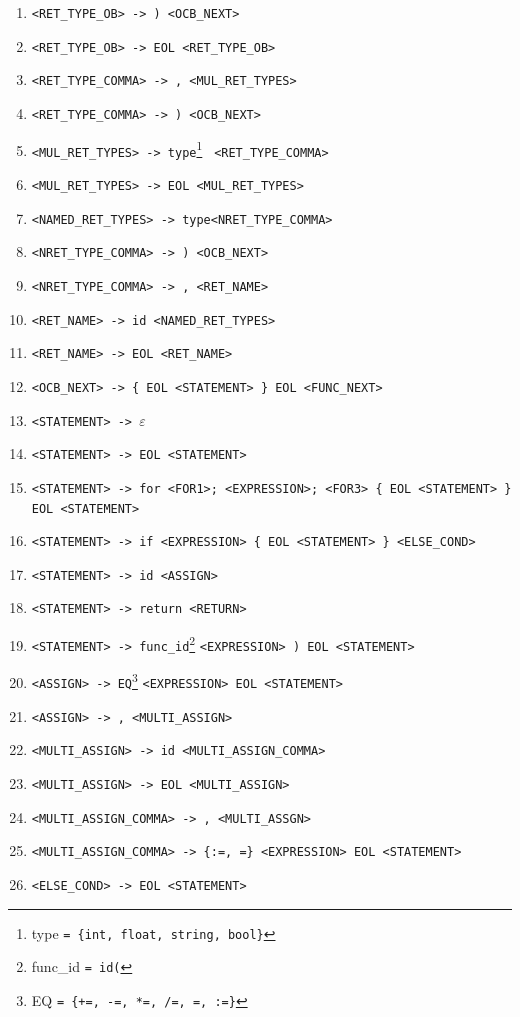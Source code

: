 \documentclass[12pt]{article}
\begin{document}
\begin{enumerate}
	\item \verb=<RET_TYPE_OB> -> ) <OCB_NEXT>=
	\item \verb=<RET_TYPE_OB> -> EOL <RET_TYPE_OB>=	
	\item \verb=<RET_TYPE_COMMA> -> , <MUL_RET_TYPES>=
	\item \verb=<RET_TYPE_COMMA> -> ) <OCB_NEXT>=
	\item \verb=<MUL_RET_TYPES> -> type=\footnote[3]{ type \texttt{= \{int, float, string, bool\}}} \verb= <RET_TYPE_COMMA>=
	\item \verb=<MUL_RET_TYPES> -> EOL <MUL_RET_TYPES>=
	\item \verb=<NAMED_RET_TYPES> -> type=\footnotemark[3] \verb=<NRET_TYPE_COMMA>=
	\item \verb=<NRET_TYPE_COMMA> -> ) <OCB_NEXT>=
	\item \verb=<NRET_TYPE_COMMA> -> , <RET_NAME>=
	\item \verb=<RET_NAME> -> id <NAMED_RET_TYPES>=
	\item \verb=<RET_NAME> -> EOL <RET_NAME>=
	\item \verb=<OCB_NEXT> -> { EOL <STATEMENT> } EOL <FUNC_NEXT>=
	\item \verb=<STATEMENT> -> =$\varepsilon$
	\item \verb=<STATEMENT> -> EOL <STATEMENT>= 
	\item \verb=<STATEMENT> -> for <FOR1>; <EXPRESSION>; <FOR3> { EOL <STATEMENT> } EOL <STATEMENT>=
	\item \verb=<STATEMENT> -> if <EXPRESSION> { EOL <STATEMENT> } <ELSE_COND>=
	\item \verb=<STATEMENT> -> id <ASSIGN>=
	\item \verb=<STATEMENT> -> return <RETURN>=
	\item \verb=<STATEMENT> -> func_id=\footnote[2]{func\_id \texttt{= id(}} \verb=<EXPRESSION> ) EOL <STATEMENT>=
	\item \verb=<ASSIGN> -> EQ=\footnote[4]{EQ \texttt{= \{+=, -=, *=, /=, =, :=\}}} \verb=<EXPRESSION> EOL <STATEMENT>=
	\item \verb!<ASSIGN> -> , <MULTI_ASSIGN>!
	\item \verb!<MULTI_ASSIGN> -> id <MULTI_ASSIGN_COMMA>!
	\item \verb!<MULTI_ASSIGN> -> EOL <MULTI_ASSIGN>!
	\item \verb!<MULTI_ASSIGN_COMMA> -> , <MULTI_ASSGN>!
	\item \verb!<MULTI_ASSIGN_COMMA> -> {:=, =} <EXPRESSION> EOL <STATEMENT>!
	\item \verb=<ELSE_COND> -> EOL <STATEMENT>= 

\end{enumerate}
\end{document}
